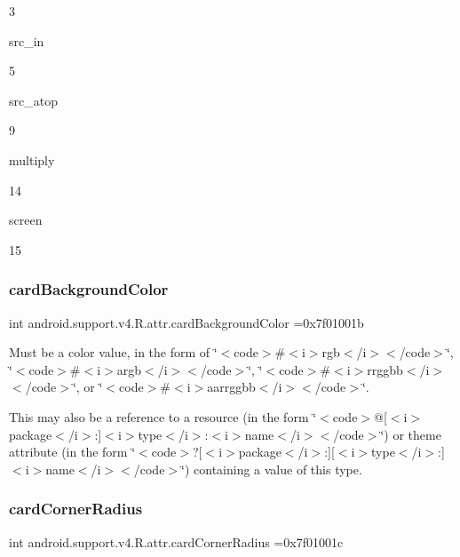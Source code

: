 3

{\ttfamily src\+\_\+in}

5

{\ttfamily src\+\_\+atop}

9

{\ttfamily multiply}

14

{\ttfamily screen}

15\mbox{\label{classandroid_1_1support_1_1v4_1_1R_1_1attr_acf5b55e359835fbeba6ee324667289c7}} 
\subsubsection{\texorpdfstring{card\+Background\+Color}{cardBackgroundColor}}
{\footnotesize\ttfamily int android.\+support.\+v4.\+R.\+attr.\+card\+Background\+Color =0x7f01001b\hspace{0.3cm}{\ttfamily [static]}}

Must be a color value, in the form of \char`\"{}$<$code$>$\#$<$i$>$rgb$<$/i$>$$<$/code$>$\char`\"{}, \char`\"{}$<$code$>$\#$<$i$>$argb$<$/i$>$$<$/code$>$\char`\"{}, \char`\"{}$<$code$>$\#$<$i$>$rrggbb$<$/i$>$$<$/code$>$\char`\"{}, or \char`\"{}$<$code$>$\#$<$i$>$aarrggbb$<$/i$>$$<$/code$>$\char`\"{}. 

This may also be a reference to a resource (in the form \char`\"{}$<$code$>$@\mbox{[}$<$i$>$package$<$/i$>$\+:\mbox{]}$<$i$>$type$<$/i$>$\+:$<$i$>$name$<$/i$>$$<$/code$>$\char`\"{}) or theme attribute (in the form \char`\"{}$<$code$>$?\mbox{[}$<$i$>$package$<$/i$>$\+:\mbox{]}\mbox{[}$<$i$>$type$<$/i$>$\+:\mbox{]}$<$i$>$name$<$/i$>$$<$/code$>$\char`\"{}) containing a value of this type. \mbox{\label{classandroid_1_1support_1_1v4_1_1R_1_1attr_a6a6c34d8de2d1debea95fc7926cbc269}} 
\subsubsection{\texorpdfstring{card\+Corner\+Radius}{cardCornerRadius}}
{\footnotesize\ttfamily int android.\+support.\+v4.\+R.\+attr.\+card\+Corner\+Radius =0x7f01001c\hspace{0.3cm}{\ttfamily [static]}}

